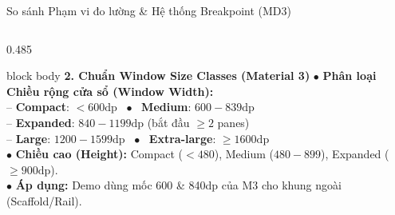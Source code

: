 \documentclass[aspectratio=169, 10pt]{beamer}
\begin{document}
\begin{frame}{So sánh Phạm vi đo lường \& Hệ thống Breakpoint (MD3)}
\begin{columns}[T]
    \begin{column}{0.485\textwidth}
      \begin{beamercolorbox}[rounded=true, shadow=false, wd=\textwidth, sep=3.5pt]{block body}
        \textbf{\scriptsize\color{blue!80!black}2. Chuẩn Window Size Classes (Material 3)}
        \vskip 0.04cm
        \scriptsize
        $\bullet$ \textbf{Phân loại Chiều rộng cửa sổ (Window Width):}\\
        -- \textbf{Compact}: $< 600\text{dp}$ \ $\bullet$ \ \textbf{Medium}: $600 - 839\text{dp}$\\
        -- \textbf{Expanded}: $840 - 1199\text{dp}$ (bắt đầu $\ge 2$ panes)\\
        -- \textbf{Large}: $1200 - 1599\text{dp}$ \ $\bullet$ \ \textbf{Extra-large}: $\ge 1600\text{dp}$\\[0.05cm]
        $\bullet$ \textbf{Chiều cao (Height):} Compact ($< 480$), Medium ($480 - 899$), Expanded ($\ge 900\text{dp}$).\\[0.05cm]
        $\bullet$ \textbf{Áp dụng:} Demo dùng mốc 600 \& 840dp của M3 cho khung ngoài (Scaffold/Rail).
      \end{beamercolorbox}
    \end{column}
  \end{columns}
\end{frame}
\end{document}
